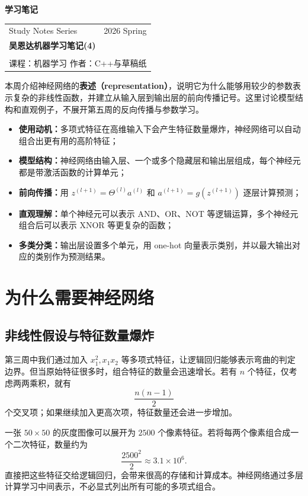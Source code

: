 \documentclass[12pt,a4paper]{ctexart}
\newcommand{\topbar}[2]{
  \noindent{\small\textcolor{MainColor}{#1}}
  \hfill{\small\bfseries\textcolor{TitleDark}{#2}}
  \par\vspace{0.35em}{\color{BorderGray}\hrule}\vspace{1.2em}
}
\newcommand{\notetitlecard}[6]{
\begin{tcolorbox}[
  enhanced,colback=white,colframe=BorderGray,boxrule=0.6pt,arc=2mm,
  left=12pt,right=12pt,top=10pt,bottom=10pt,
  borderline west={4pt}{0pt}{SecondColor}]
\begin{tabularx}{\linewidth}{X r}
{\small\textcolor{TextGray}{#1}} & {\small\textcolor{TextGray}{#2}} \\[0.9em]
\multicolumn{2}{l}{{\Huge\bfseries\textcolor{MainColor}{#3}}} \\[0.45em]
\multicolumn{2}{l}{{\large\textcolor{SecondColor!90!black}{#4}}} \\[0.45em]
\multicolumn{2}{l}{{\small\textcolor{TextGray}{课程：#5 \qquad 作者：#6}}}
\end{tabularx}
\end{tcolorbox}
\vspace{1em}
}
\newcommand{\concept}[1]{\textbf{\textcolor{DefineColor}{#1}}}
\begin{document}
\topbar{吴恩达机器学习}{学习笔记}

\notetitlecard
  {Study Notes Series}
  {2026 Spring}
  {吴恩达机器学习笔记(4)}
  {}
  {机器学习}
  {C++与草稿纸}

\begin{summarybox}
本周介绍神经网络的\concept{表述（representation）}，说明它为什么能够用较少的参数表示复杂的非线性函数，并建立从输入层到输出层的前向传播记号。这里讨论模型结构和直观例子，不展开第五周的反向传播与参数学习。
\begin{itemize}[leftmargin=2em,itemsep=2pt,topsep=4pt]
  \item \textbf{使用动机：}多项式特征在高维输入下会产生特征数量爆炸，神经网络可以自动组合出更有用的高阶特征；
  \item \textbf{模型结构：}神经网络由输入层、一个或多个隐藏层和输出层组成，每个神经元都是带激活函数的计算单元；
  \item \textbf{前向传播：}用 $z^{(l+1)}=\Theta^{(l)}a^{(l)}$ 和 $a^{(l+1)}=g(z^{(l+1)})$ 逐层计算预测；
  \item \textbf{直观理解：}单个神经元可以表示 AND、OR、NOT 等逻辑运算，多个神经元组合后可以表示 XNOR 等更复杂的函数；
  \item \textbf{多类分类：}输出层设置多个单元，用 one-hot 向量表示类别，并以最大输出对应的类别作为预测结果。
\end{itemize}
\end{summarybox}

\section{为什么需要神经网络}

\subsection{非线性假设与特征数量爆炸}

\begin{definitionbox}[多项式特征的局限]
第三周中我们通过加入 $x_1^2,x_1x_2$ 等多项式特征，让逻辑回归能够表示弯曲的判定边界。但当原始特征很多时，组合特征的数量会迅速增长。若有 $n$ 个特征，仅考虑两两乘积，就有
\[
  \frac{n(n-1)}{2}
\]
个交叉项；如果继续加入更高次项，特征数量还会进一步增加。
\end{definitionbox}

\begin{examplebox}[图像分类中的特征规模]
一张 $50\times50$ 的灰度图像可以展开为 $2500$ 个像素特征。若将每两个像素组合成一个二次特征，数量约为
\[
  \frac{2500^2}{2}\approx3.1\times10^6.
\]
直接把这些特征交给逻辑回归，会带来很高的存储和计算成本。神经网络通过多层计算学习中间表示，不必显式列出所有可能的多项式组合。
\end{examplebox}
\end{document}
